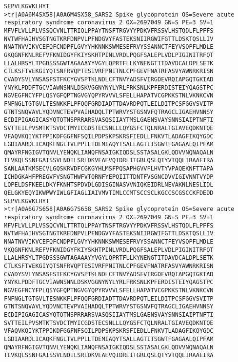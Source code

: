 \documentclass[en,black,12pt,normal]{elegantnote}
\begin{document}
\begin{lstlisting}
SEPVLKGVKLHYT
>tr|A0A6M4SX58|A0A6M4SX58_SARS2 Spike glycoprotein OS=Severe acute respiratory syndrome coronavirus 2 OX=2697049 GN=S PE=3 SV=1
MFVFLVLLPLVSSQCVNLTTRIQLPPAYTNSFTRGVYYPDKVFRSSVLHSTQDLFLPFFS
NVTWFHAIHVSGTNGTKRFDNPVLPFNDGVYFASTEKSNIIRGWIFGTTLDSKTQSLLIV
NNATNVVIKVCEFQFCNDPFLGVYYHKNNKSWMESEFRVYSSANNCTFEYVSQPFLMDLE
GKQGNFKNLREFVFKNIDGYFKIYSKHTPINLVRDLPQGFSALEPLVDLPIGINITRFQT
LLALHRSYLTPGDSSSGWTAGAAAYYVGYLQPRTFLLKYNENGTITDAVDCALDPLSETK
CTLKSFTVEKGIYQTSNFRVQPTESIVRFPNITNLCPFGEVFNATRFASVYAWNRKRISN
CVADYSVLYNSASFSTFKCYGVSPTKLNDLCFTNVYADSFVIRGDEVRQIAPGQTGKIAD
YNYKLPDDFTGCVIAWNSNNLDSKVGGNYNYLYRLFRKSNLKPFERDISTEIYQAGSTPC
NGVEGFNCYFPLQSYGFQPTNGVGYQPYRVVVLSFELLHAPATVCGPKKSTNLVKNKCVN
FNFNGLTGTGVLTESNKKFLPFQQFGRDIADTTDAVRDPQTLEILDITPCSFGGVSVITP
GTNTSNQVAVLYQDVNCTEVPVAIHADQLTPTWRVYSTGSNVFQTRAGCLIGAEHVNNSY
ECDIPIGAGICASYQTQTNSPRRARSVASQSIIAYTMSLGAENSVAYSNNSIAIPTNFTI
SVTTEILPVSMTKTSVDCTMYICGDSTECSNLLLQYGSFCTQLNRALTGIAVEQDKNTQE
VFAQVKQIYKTPPIKDFGGFNFSQILPDPSKPSKRSFIEDLLFNKVTLADAGFIKQYGDC
LGDIAARDLICAQKFNGLTVLPPLLTDEMIAQYTSALLAGTITSGWTFGAGAALQIPFAM
QMAYRFNGIGVTQNVLYENQKLIANQFNSAIGKIQDSLSSTASALGKLQDVVNQNAQALN
TLVKQLSSNFGAISSVLNDILSRLDKVEAEVQIDRLITGRLQSLQTYVTQQLIRAAEIRA
SANLAATKMSECVLGQSKRVDFCGKGYHLMSFPQSAPHGVVFLHVTYVPAQEKNFTTAPA
ICHDGKAHFPREGVFVSNGTHWFVTQRNFYEPQIITTDNTFVSGNCDVVIGIVNNTVYDP
LQPELDSFKEELDKYFKNHTSPDVDLGDISGINASVVNIQKEIDRLNEVAKNLNESLIDL
QELGKYEQYIKWPWYIWLGFIAGLIAIVMVTIMLCCMTSCCSCLKGCCSCGSCCKFDEDD
SEPVLKGVKLHYT
>tr|A0A6G7S658|A0A6G7S658_SARS2 Spike glycoprotein OS=Severe acute respiratory syndrome coronavirus 2 OX=2697049 GN=S PE=3 SV=1
MFVFLVLLPLVSSQCVNLTTRTQLPPAYTNSFTRGVYYPDKVFRSSVLHSTQDLFLPFFS
NVTWFHAIHVSGTNGTKRFDNPVLPFNDGVYFASTEKSNIIRGWIFGTTLDSKTQSLLIV
NNATNVVIKVCEFQFCNDPFLGVYYHKNNKSWMESEFRVYSSANNCTFEYVSQPFLMDLE
VKQGNFKNLREFVFKNIDGYFKIYSKHTPINLVRDLPQGFSALEPLVDLPIGINITRFQT
LLALHRSYLTPGDSSSGWTAGAAAYYVGYLQPRTFLLKYNENGTITDAVDCALDPLSETK
CTLKSFTVEKGIYQTSNFRVQPTESIVRFPNITNLCPFGEVFNATRFASVYAWNRKRISN
CVADYSVLYNSASFSTFKCYGVSPTKLNDLCFTNVYADSFVIRGDEVRQIAPGQTGKIAD
YNYKLPDDFTGCVIAWNSNNLDSKVGGNYNYLYRLFRKSNLKPFERDISTEIYQAGSTPC
NGVEGFNCYFPLQSYGFQPTNGVGYQPYRVVVLSFELLHAPATVCGPKKSTNLVKNKCVN
FNFNGLTGTGVLTESNKKFLPFQQFGRDIADTTDAVRDPQTLEILDITPCSFGGVSVITP
GTNTSNQVAVLYQDVNCTEVPVAIHADQLTPTWRVYSTGSNVFQTRAGCLIGAEHVNNSY
ECDIPIGAGICASYQTQTNSPRRARSVASQSIIAYTMSLGAENSVAYSNNSIAIPTNFTI
SVTTEILPVSMTKTSVDCTMYICGDSTECSNLLLQYGSFCTQLNRALTGIAVEQDKNTQE
VFAQVKQIYKTPPIKDFGGFNFSQILPDPSKPSKRSFIEDLLFNKVTLADAGFIKQYGDC
LGDIAARDLICAQKFNGLTVLPPLLTDEMIAQYTSALLAGTITSGWTFGAGAALQIPFAM
QMAYRFNGIGVTQNVLYENQKLIANQFNSAIGKIQDSLSSTASALGKLQDVVNQNAQALN
TLVKQLSSNFGAISSVLNDILSRLDKVEAEVQIDRLITGRLQSLQTYVTQQLIRAAEIRA

\end{lstlisting}
\end{document}
